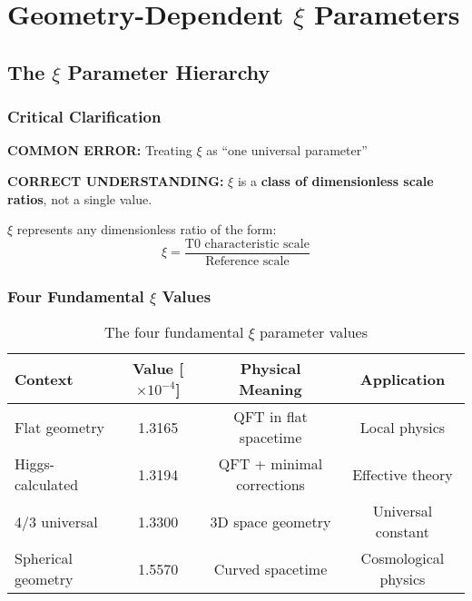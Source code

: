 \documentclass[12pt,a4paper]{article}
\newcommand{\xipar}{\ensuremath{\xi}}
\newcommand{\mytimes}{\ensuremath{\times}}
\begin{document}
	\section{Geometry-Dependent $\xi$ Parameters}
	\label{sec:geometry_dependent_xi}
	
	\subsection{The $\xi$ Parameter Hierarchy}
	\label{subsec:xi_hierarchy}
	
	\subsubsection{Critical Clarification}
	\label{subsubsec:critical_clarification}
	
	\begin{tcolorbox}[colback=red!10!white,colframe=red!75!black,title=CRITICAL WARNING: $\xi$ Parameter Confusion]
		\textbf{COMMON ERROR:} Treating $\xi$ as ``one universal parameter''
		
		\textbf{CORRECT UNDERSTANDING:} $\xi$ is a \textbf{class of dimensionless scale ratios}, not a single value.
		
		$\xi$ represents any dimensionless ratio of the form:
		\begin{equation}
			\xipar = \frac{\text{T0 characteristic scale}}{\text{Reference scale}}
		\end{equation}
	\end{tcolorbox}
	
	\subsubsection{Four Fundamental $\xi$ Values}
	\label{subsubsec:four_fundamental_values}
	
	\begin{table}[htbp]
		\centering
		\begin{tabular}{lccc}
			\toprule
			\textbf{Context} & \textbf{Value [$\mytimes 10^{-4}$]} & \textbf{Physical Meaning} & \textbf{Application} \\
			\midrule
			Flat geometry & 1.3165 & QFT in flat spacetime & Local physics \\
			Higgs-calculated & 1.3194 & QFT + minimal corrections & Effective theory \\
			4/3 universal & 1.3300 & 3D space geometry & Universal constant \\
			Spherical geometry & 1.5570 & Curved spacetime & Cosmological physics \\
			\bottomrule
		\end{tabular}
		\caption{The four fundamental $\xi$ parameter values}
		\label{tab:four_xi_values}
	\end{table}
	
\end{document}
